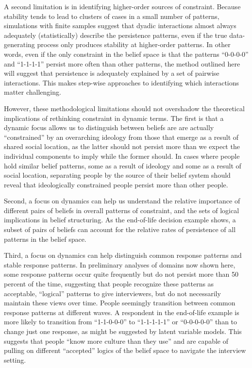 \documentclass[12pt,]{article}
\begin{document}
A second limitation is in identifying higher-order sources of constraint. Because stability tends to lead to clusters of cases in a small number of patterns, simulations with finite samples suggest that dyadic interactions almost always adequately (statistically) describe the persistence patterns, even if the true data-generating process only produces stability at higher-order patterns. In other words, even if the only constraint in the belief space is that the patterns ``0-0-0-0'' and ``1-1-1-1'' persist more often than other patterns, the method outlined here will suggest that persistence is adequately explained by a set of pairwise interactions. This makes step-wise approaches to identifying which interactions matter challenging.

However, these methodological limitations should not overshadow the theoretical implications of rethinking constraint in dynamic terms. The first is that a dynamic focus allows us to distinguish between beliefs are are actually ``constrained'' by an overarching ideology from those that emerge as a result of shared social location, as the latter should not persist more than we expect the individual components to imply while the former should. In cases where people hold similar belief patterns, some as a result of ideology and some as a result of social location, separating people by the source of their belief system should reveal that ideologically constrained people persist more than other people.

Second, a focus on dynamics can help us understand the relative importance of different pairs of beliefs in overall patterns of constraint, and the sets of logical implications in belief structuring. As the end-of-life decision example shows, a subset of pairs of beliefs can account for the relative rates of persistence of all patterns in the belief space.

Third, a focus on dynamics can help distinguish common response patterns and stable response patterns. In preliminary analyses of domains now shown here, some response patterns occur quite frequently but do not persist more than 50 percent of the time, suggesting that people recognize these patterns as acceptable, ``logical'' patterns to give interviewers, but do not necessarily maintain these views over time. People seemingly transition between common response patterns at different waves. A respondent in the end-of-life example is more likely to transition from ``1-1-0-0-0'' to ``1-1-1-1-1'' or ``0-0-0-0-0'' than to change just one response, as might be suggested by latent variable models. This suggests that people ``know more culture than they use'' and are capable of pulling on different ``accepted'' logics of the belief space to navigate the interview setting.
\end{document}
